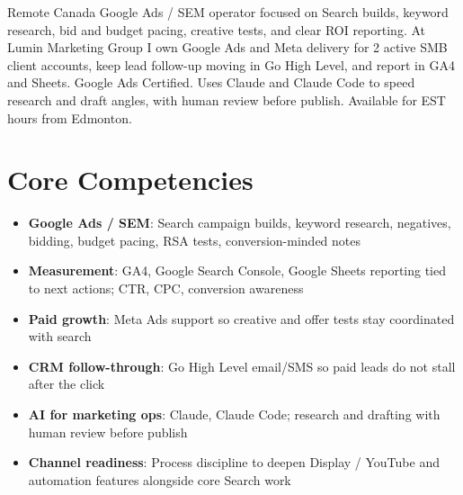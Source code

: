 \documentclass[11pt,a4paper,sans]{moderncv}
\begin{document}
\makecvtitle

\vspace{6pt}
\small{Remote Canada Google Ads / SEM operator focused on Search builds, keyword research, bid and budget pacing, creative tests, and clear ROI reporting. At Lumin Marketing Group I own Google Ads and Meta delivery for 2 active SMB client accounts, keep lead follow-up moving in Go High Level, and report in GA4 and Sheets. Google Ads Certified. Uses Claude and Claude Code to speed research and draft angles, with human review before publish. Available for EST hours from Edmonton.}

\section{Core Competencies}
\vspace{1pt}
\begin{itemize}
\item \textbf{Google Ads / SEM}: Search campaign builds, keyword research, negatives, bidding, budget pacing, RSA tests, conversion-minded notes
\item \textbf{Measurement}: GA4, Google Search Console, Google Sheets reporting tied to next actions; CTR, CPC, conversion awareness
\item \textbf{Paid growth}: Meta Ads support so creative and offer tests stay coordinated with search
\item \textbf{CRM follow-through}: Go High Level email/SMS so paid leads do not stall after the click
\item \textbf{AI for marketing ops}: Claude, Claude Code; research and drafting with human review before publish
\item \textbf{Channel readiness}: Process discipline to deepen Display / YouTube and automation features alongside core Search work
\end{itemize}
\end{document}
